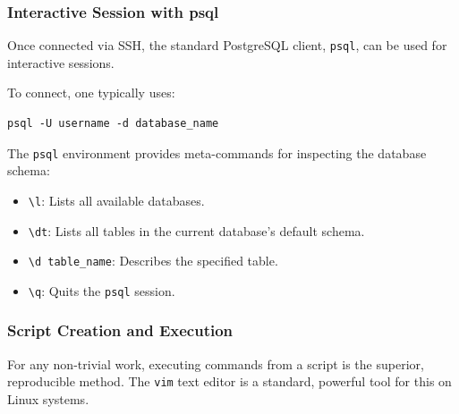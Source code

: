 \subsubsection{Interactive Session with psql}
Once connected via SSH, the standard PostgreSQL client, \texttt{psql}, can be used for interactive sessions.

\noindent To connect, one typically uses:
\begin{verbatim}
psql -U username -d database_name
\end{verbatim}
The \texttt{psql} environment provides meta-commands for inspecting the database schema:
\begin{itemize}
    \item \texttt{\textbackslash l}: Lists all available databases.
    \item \texttt{\textbackslash dt}: Lists all tables in the current database's default schema.
    \item \texttt{\textbackslash d table\_name}: Describes the specified table.
    \item \texttt{\textbackslash q}: Quits the \texttt{psql} session.
\end{itemize}

\subsubsection{Script Creation and Execution}
For any non-trivial work, executing commands from a script is the superior, reproducible method. The \texttt{vim} text editor is a standard, powerful tool for this on Linux systems.

